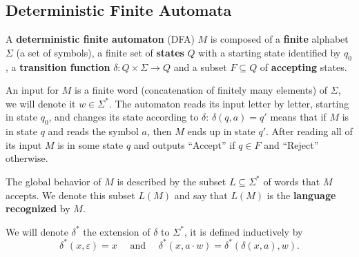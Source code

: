\documentclass[main.tex]{subfiles}
\begin{document}
\subsection{Deterministic Finite Automata}
\begin{defn}[DFA]
	A \textbf{deterministic finite automaton} (DFA) $M$ is composed of a \textbf{finite} alphabet $\Sigma$ (a set of symbols), a finite set of \textbf{states} $Q$ with a starting state identified by $q_0$, a \textbf{transition function} $\delta: Q\times \Sigma \rightarrow Q$ and a subset $F \subseteq Q$ of \textbf{accepting} states. 
	
	An input for $M$ is a finite word (concatenation of finitely many elements) of $\Sigma$, we will denote it $w \in \Sigma^*$. The automaton reads its input letter by letter, starting in state $q_0$, and changes its state according to $\delta$: $\delta(q, a) = q'$ means that if $M$ is in state $q$ and reads the symbol $a$, then $M$ ends up in state $q'$. After reading all of its input $M$ is in some state $q$ and outputs ``Accept'' if $q \in F$ and ``Reject'' otherwise.
	
	The global behavior of $M$ is described by the subset $L \subseteq \Sigma^*$ of words that $M$ accepts. We denote this subset $L(M)$ and say that $L(M)$ is the \textbf{language recognized} by $M$.
	
	We will denote $\delta^*$ the extension of $\delta$ to $\Sigma^*$, it is defined inductively by 
	\[\delta^*(x,\varepsilon) = x \quad \text{ and } \quad \delta^*(x,a\cdot w) = \delta^*(\delta(x,a),w).\]
\end{defn}
\end{document}
